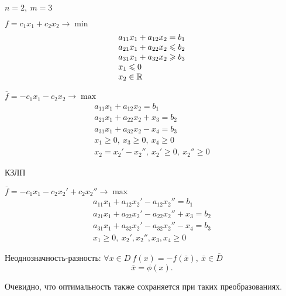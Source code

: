 \begin{note}
    $ n = 2, \ m = 3 $
    \begin{multicols}{2}
        $ f = c_1 x_1 + c_2 x_2 \rightarrow \min $
        \[
            \begin{array}{l}
                a_{11}x_1 + a_{12}x_2 = b_1         \\
                a_{21}x_1 + a_{22}x_2 \leqslant b_2 \\
                a_{31}x_1 + a_{32}x_2 \geqslant b_3 \\
                x_1 \leqslant 0                     \\
                x_2 \in \mathbb{R}
            \end{array}
        \]

        $ \overline{f} = -c_1 x_1 - c_2 x_2 \rightarrow \max $
        \[
            \begin{array}{l}
                a_{11}x_1 + a_{12}x_2 = b_1                           \\
                a_{21}x_1 + a_{22}x_2 + x_3 = b_2                     \\
                a_{31}x_1 + a_{32}x_2 - x_4 = b_3                     \\
                x_1 \geqslant 0, \ x_3 \geqslant 0, \ x_4 \geqslant 0 \\
                x_2  = x_2' - x_2'', \ x_2' \geqslant 0, \ x_2'' \geqslant 0
            \end{array}
        \]
    \end{multicols}

    КЗЛП

    $ \overline{f} = - c_1 x_1 - c_2x_2' + c_2x_2'' \rightarrow \max $
    \[
        \begin{array}{l}
            a_{11}x_1 + a_{12}x_2' - a_{12}x_2'' = b_1       \\
            a_{21}x_1 + a_{22}x_2' - a_22x_2'' + x_3 = b_2   \\
            a_{31}x_1 + a_{32}x_2' - a_{32}x_2'' - x_4 = b_3 \\
            x_1 \geqslant 0, \ x_2',x_2'',x_3,x_4 \geqslant 0
        \end{array}
    \]

    Неоднозначность-разность: $ \forall x \in D \ f(x) = -f(\overline{x}), \ \overline{x} \in \overline{D} $
    \[
        \overline{x} = \phi(x).
    \]

    Очевидно, что оптимальность также сохраняется при таких преобразованиях.
\end{note}

